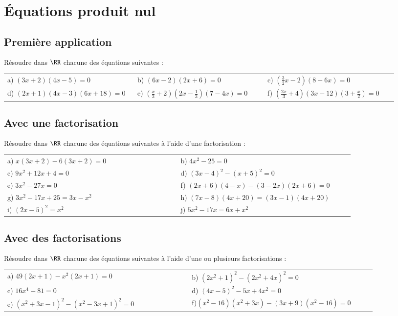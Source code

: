 \documentclass[oneside,12pt]{article}          %
\begin{document}
\section{Équations produit nul}

\subsection{Première application}
Résoudre dans $\RR$ chacune des équations suivantes :

\begin{tabular}{p{0.32\linewidth} p{0.32\linewidth} p{0.32\linewidth}}
	a) $(3x+2)(4x-5)=0$ & b) $(6x-2)(2x+6)=0$ & c) $\left(\frac{3}{2}x-2\right)(8-6x)=0$ \\
	d) $(2x+1)(4x-3)(6x+18)=0$ & e) $\left(\frac{x}{3}+2\right)\left(2x-\frac{1}{3}\right)(7-4x)=0$ & f) $\left(\frac{2x}{3}+4\right)(3x-12)\left(3+\frac{x}{2}\right)=0$
\end{tabular}



\subsection{Avec une factorisation}
Résoudre dans $\RR$ chacune des équations suivantes à l'aide d'une factorisation :

\begin{tabular}{p{0.45\linewidth} p{0.45\linewidth}}
	a) $x(3x+2)-6(3x+2)=0$ & b) $4x^2-25=0$ \\
	c) $9x^2+12x+4=0$ & d) $(3x-4)^2-(x+5)^2=0$ \\
	e) $3x^2-27x=0$ & f) $(2x+6)(4-x)-(3-2x)(2x+6)=0$ \\
	g) $3x^2-17x+25=3x-x^2$ & h) $(7x-8)(4x+20)=(3x-1)(4x+20)$ \\
	i) $(2x-5)^2=x^2$ & j) $5x^2-17x=6x+x^2$
\end{tabular}



\subsection{Avec des factorisations}
Résoudre dans $\RR$ chacune des équations suivantes à l'aide d'une ou plusieurs factorisations :

\begin{tabular}{p{0.45\linewidth} p{0.45\linewidth}}
	a) $49(2x+1)-x^2(2x+1)=0$ & b) $(2x^2+1)^2-(2x^2+4x)^2=0$ \\
	c) $16x^4-81=0$ & d) $(4x-5)^2-5x+4x^2=0$ \\
	e) $(x^2+3x-1)^2-(x^2-3x+1)^2=0$ & f)$(x^2-16)(x^2+3x)-(3x+9)(x^2-16)=0$
\end{tabular}
\end{document}
